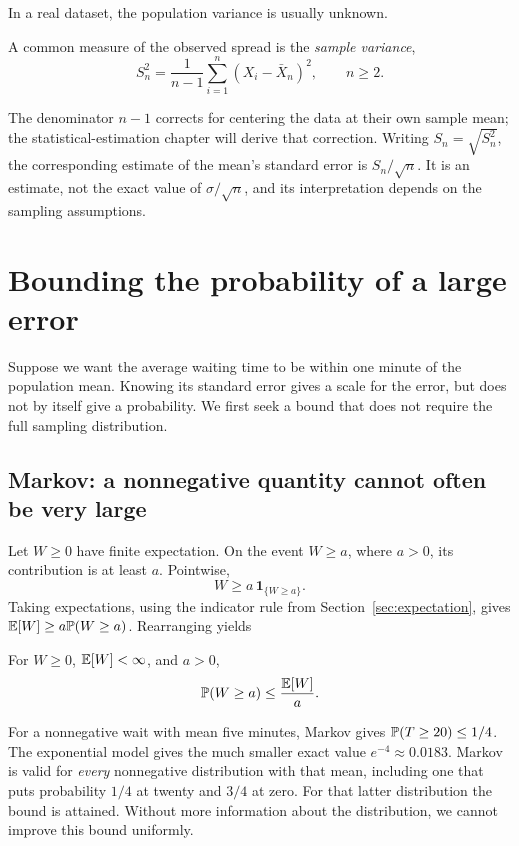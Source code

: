 In a real dataset, the population variance is usually unknown.
\begin{definition}
A common
measure of the observed spread is the \emph{sample variance},
\[
  S_n^2=\frac1{n-1}\sum_{i=1}^n(X_i-\bar X_n)^2,
  \qquad n\ge2.
\]
\end{definition}
The denominator \(n-1\) corrects for centering the data at their own
sample mean; the statistical-estimation chapter will derive that
correction. Writing \(S_n=\sqrt{S_n^2}\), the corresponding estimate
of the mean's standard error is \(S_n/\sqrt n\). It is an estimate,
not the exact value of \(\sigma/\sqrt n\), and its interpretation
depends on the sampling assumptions.

\section{Bounding the probability of a large error}
\label{sec:concentration}

Suppose we want the average waiting time to be within one minute of
the population mean. Knowing its standard error gives a scale for
the error, but does not by itself give a probability. We first seek a
bound that does not require the full sampling distribution.

\subsection{Markov: a nonnegative quantity cannot often be very large}

Let \(W\ge0\) have finite expectation. On the event \(W\ge a\),
where \(a>0\), its contribution is at least \(a\). Pointwise,
\[
  W\ge a\,\mathbf1_{\{W\ge a\}}.
\]
Taking expectations, using the indicator rule from
Section~\ref{sec:expectation}, gives
\(\mathbb{E}[W]\ge a\mathbb{P}(W\ge a)\). Rearranging yields
\begin{theorem}
For \(W\ge0\), \(\mathbb{E}[W]<\infty\), and \(a>0\),
\begin{equation}
  \mathbb{P}(W\ge a)\le\frac{\mathbb{E}[W]}{a}.
  \label{eq:markov}
\end{equation}
\end{theorem}

For a nonnegative wait with mean five minutes, Markov gives
\(\mathbb{P}(T\ge20)\le1/4\). The exponential model gives the much smaller
exact value \(e^{-4}\approx0.0183\). Markov is valid for \emph{every}
nonnegative distribution with that mean, including one that puts
probability \(1/4\) at twenty and \(3/4\) at zero. For that latter
distribution the bound is attained. Without more information about
the distribution, we cannot improve this bound uniformly.

